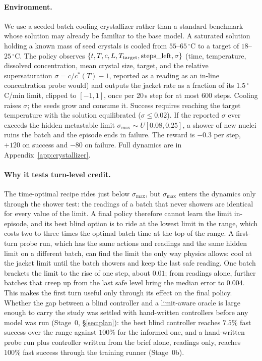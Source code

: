 \documentclass[11pt,a4paper]{article}
\begin{document}
\paragraph{Environment.} We use a seeded batch cooling crystallizer rather than a standard benchmark whose solution may already be familiar to the base model. A saturated solution holding a known mass of seed crystals is cooled from $55$--$65\,^\circ$C to a target of $18$--$25\,^\circ$C. The policy observes $\{t,T,c,L,T_{\rm target},\text{steps\_left},\sigma\}$ (time, temperature, dissolved concentration, mean crystal size, target, and the relative supersaturation $\sigma=c/c^*(T)-1$, reported as a reading as an in-line concentration probe would) and outputs the jacket rate as a fraction of its $1.5\,^\circ$C/min limit, clipped to $[-1,1]$, once per 20\,s step for at most 600 steps. Cooling raises $\sigma$; the seeds grow and consume it. Success requires reaching the target temperature with the solution equilibrated ($\sigma\le0.02$). If the reported $\sigma$ ever exceeds the hidden metastable limit $\sigma_{\max}\sim U[0.08,0.25]$, a shower of new nuclei ruins the batch and the episode ends in failure. The reward is $-0.3$ per step, $+120$ on success and $-80$ on failure. Full dynamics are in Appendix~\ref{app:crystallizer}.

\paragraph{Why it tests turn-level credit.} The time-optimal recipe rides just below $\sigma_{\max}$, but $\sigma_{\max}$ enters the dynamics only through the shower test: the readings of a batch that never showers are identical for every value of the limit. A final policy therefore cannot learn the limit in-episode, and its best blind option is to ride at the lowest limit in the range, which costs two to three times the optimal batch time at the top of the range. A first-turn probe run, which has the same actions and readings and the same hidden limit on a different batch, can find the limit the only way physics allows: cool at the jacket limit until the batch showers and keep the last safe reading. One batch brackets the limit to the rise of one step, about $0.01$; from readings alone, further batches that creep up from the last safe level bring the median error to $0.004$. This makes the first turn useful only through its effect on the final policy. Whether the gap between a blind controller and a limit-aware oracle is large enough to carry the study was settled with hand-written controllers before any model was run (Stage~0, \S\ref{sec:plan}): the best blind controller reaches $7.5\%$ fast success over the range against $100\%$ for the informed one, and a hand-written probe run plus controller written from the brief alone, readings only, reaches $100\%$ fast success through the training runner (Stage~0b).
\end{document}
